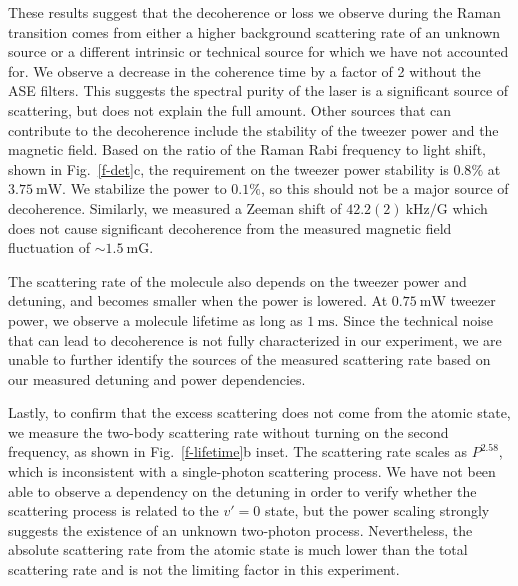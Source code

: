\documentclass[aps,prl,twocolumn,10pt,superscriptaddress]{revtex4-1}
\newcommand{\todo}[1]{}
\begin{document}
\todo{change scattering to decoherence? since the fluctuation of light shift
  does not lead to scattering but only decherence.}
These results suggest that the decoherence or loss we observe during the Raman transition
comes from either a higher background scattering rate of an unknown source
or a different intrinsic or technical source for which we have not accounted for.
We observe a decrease in the coherence time by a factor of 2 without the ASE filters. This
suggests the spectral purity of the laser is a significant source of scattering, but does not explain the full amount.
Other sources that can contribute to the decoherence include
the stability of the tweezer power and the magnetic field.
Based on the ratio of the Raman Rabi frequency to light shift, shown in Fig.~\ref{f-det}c,
the requirement on the tweezer power stability is $0.8\mathrm{\%}$ at $3.75~\mathrm{mW}$. We stabilize the power to $0.1\mathrm{\%}$, so this should not be a major source of decoherence.
Similarly, we measured a Zeeman shift of $42.2(2)~\mathrm{kHz/G}$
which does not cause significant decoherence from the measured magnetic field
fluctuation of $\sim1.5~\mathrm{mG}$.

The scattering rate of the molecule also depends on the tweezer power and detuning,
and becomes smaller when the power is lowered.
At $0.75~\mathrm{mW}$ tweezer power, we observe a molecule lifetime as long as $1~\mathrm{ms}$.
Since the technical noise that can lead to decoherence
is not fully characterized in our experiment,
we are unable to further identify the sources of the measured scattering rate
based on our measured detuning and power dependencies.

Lastly, to confirm that the excess scattering does not come from the atomic state,
we measure the two-body scattering rate
without turning on the second frequency, as shown in Fig.~\ref{f-lifetime}b inset.
The scattering rate scales as $P^{2.58}$,
which is inconsistent with a single-photon scattering process.
We have not been able to observe a dependency on the detuning in order to verify whether the scattering process is related to the $v'=0$ state,
but the power scaling strongly suggests the existence of an unknown two-photon process.
Nevertheless, the absolute scattering rate from the atomic state
is much lower than the total scattering rate
and is not the limiting factor in this experiment.
\end{document}
